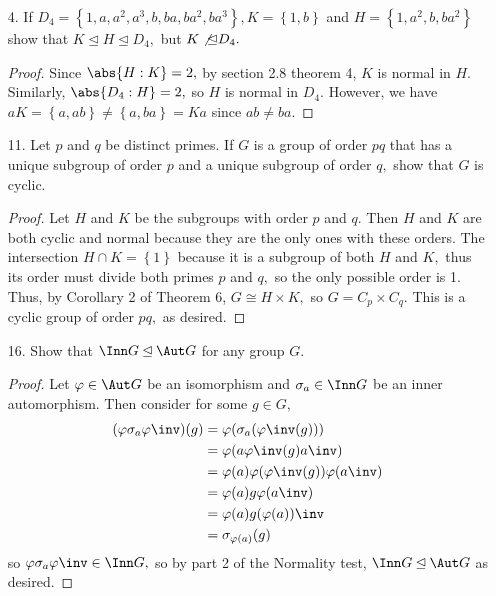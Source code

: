 \documentclass{article}
\begin{document}
\begin{itemize}
	\item[4.] If $D_4=\left\{ 1, a, a^2, a^3, b, ba, ba^2, ba^3 \right\},K=\left\{ 1, b \right\}$ and $H=\left\{ 1, a^2, b, ba^2\right\}$ show that $K\unlhd H\unlhd D_4,$ but $K\not\unlhd D_4.$
		\begin{proof}
			Since $\abs{H:K}=2,$ by section 2.8 theorem 4, $K$ is normal in $H.$ Similarly, $\abs{D_4:H}=2,$ so $H$ is normal in $D_4.$ However, we have $aK=\left\{ a, ab \right\}\neq \left\{ a, ba \right\}=Ka$ since $ab\neq ba.$
			
		\end{proof}

	\item[11.] Let $p$ and $q$ be distinct primes. If $G$ is a group of order $pq$ that has a unique subgroup of order $p$ and a unique subgroup of order $q,$ show that $G$ is cyclic.
		\begin{proof}
			Let $H$ and $K$ be the subgroups with order $p$ and $q.$ Then $H$ and $K$ are both cyclic and normal because they are the only ones with these orders. The intersection $H\cap K=\left\{ 1 \right\}$ because it is a subgroup of both $H$ and $K,$ thus its order must divide both primes $p$ and $q,$ so the only possible order is 1. Thus, by Corollary 2 of Theorem 6, $G\cong H\times K,$ so $G=C_p\times C_q.$ This is a cyclic group of order $pq,$ as desired.
			
		\end{proof}

	\item[16.] Show that $\Inn G\unlhd \Aut G$ for any group $G.$
		\begin{proof}
			Let $\varphi\in\Aut G$ be an isomorphism and $\sigma_a\in\Inn G$ be an inner automorphism. Then consider for some $g\in G,$
			\begin{align*}
				(\varphi\sigma_a\varphi\inv)(g) &= \varphi(\sigma_a(\varphi\inv(g))) \\
				&= \varphi(a\varphi\inv(g)a\inv) \\
				&= \varphi(a)\varphi(\varphi\inv(g))\varphi(a\inv) \\
				&= \varphi(a) g \varphi(a\inv) \\
				&= \varphi(a) g(\varphi(a))\inv \\
				&= \sigma_{\varphi(a)}(g)
			\end{align*} so $\varphi\sigma_a\varphi\inv\in \Inn G,$ so by part 2 of the Normality test, $\Inn G\unlhd \Aut G$ as desired.
			

\end{proof}
\end{itemize}
\end{document}
